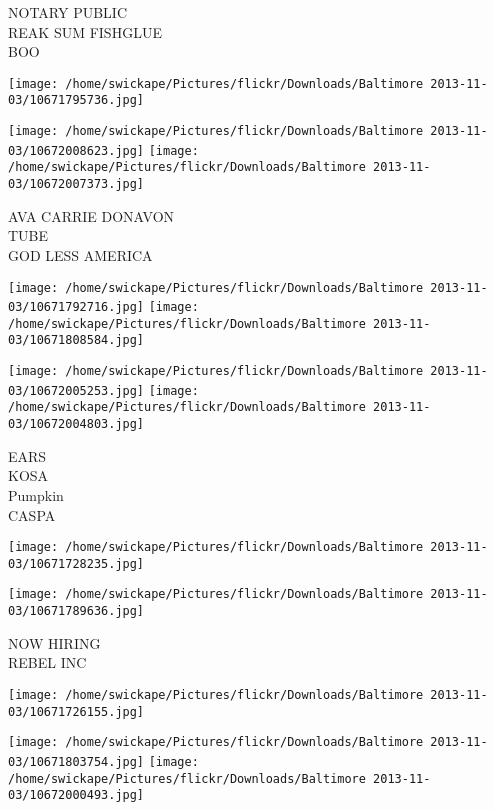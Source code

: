 \documentclass[10pt,letterpaper]{article}
\begin{document}
NOTARY PUBLIC\\
REAK SUM FISHGLUE\\
BOO\\
\pagebreak

\texttt{[image: /home/swickape/Pictures/flickr/Downloads/Baltimore 2013-11-03/10671795736.jpg]}

\vspace{0.25in}
\texttt{[image: /home/swickape/Pictures/flickr/Downloads/Baltimore 2013-11-03/10672008623.jpg]}
\texttt{[image: /home/swickape/Pictures/flickr/Downloads/Baltimore 2013-11-03/10672007373.jpg]}

AVA CARRIE DONAVON\\
TUBE\\
GOD LESS AMERICA\\
\pagebreak

\texttt{[image: /home/swickape/Pictures/flickr/Downloads/Baltimore 2013-11-03/10671792716.jpg]}
\texttt{[image: /home/swickape/Pictures/flickr/Downloads/Baltimore 2013-11-03/10671808584.jpg]}

\texttt{[image: /home/swickape/Pictures/flickr/Downloads/Baltimore 2013-11-03/10672005253.jpg]}
\texttt{[image: /home/swickape/Pictures/flickr/Downloads/Baltimore 2013-11-03/10672004803.jpg]}

EARS\\
KOSA\\
Pumpkin\\
CASPA\\
\pagebreak

\texttt{[image: /home/swickape/Pictures/flickr/Downloads/Baltimore 2013-11-03/10671728235.jpg]}

\vspace{0.25in}
\texttt{[image: /home/swickape/Pictures/flickr/Downloads/Baltimore 2013-11-03/10671789636.jpg]}

NOW HIRING\\
REBEL INC\\
\pagebreak

\texttt{[image: /home/swickape/Pictures/flickr/Downloads/Baltimore 2013-11-03/10671726155.jpg]}

\vspace{0.25in}
\texttt{[image: /home/swickape/Pictures/flickr/Downloads/Baltimore 2013-11-03/10671803754.jpg]}
\texttt{[image: /home/swickape/Pictures/flickr/Downloads/Baltimore 2013-11-03/10672000493.jpg]}
\end{document}
